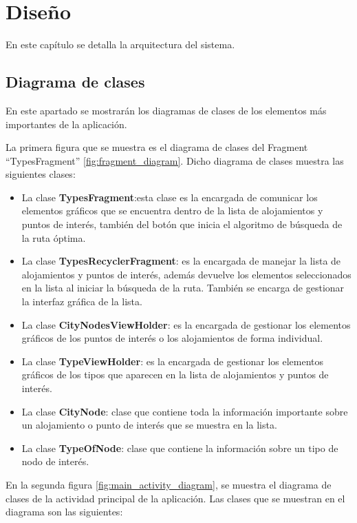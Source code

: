\chapter{Diseño}
En este capítulo se detalla la arquitectura del sistema.
\section[Diagrama de clases]{Diagrama de clases}
En este apartado se mostrarán los diagramas de clases de los elementos más importantes de la aplicación.\newline

La primera figura que se muestra es el diagrama de clases del Fragment \enquote{TypesFragment} \ref{fig:fragment_diagram}. Dicho diagrama de clases muestra las siguientes clases:
\begin{itemize}
	\item La clase \textbf{TypesFragment}:esta clase es la encargada de comunicar los elementos gráficos que se encuentra dentro de la lista de alojamientos y puntos de interés, también del botón que inicia el algoritmo de búsqueda de la ruta óptima.
	\item La clase \textbf{TypesRecyclerFragment}: es la encargada de manejar la lista de alojamientos y puntos de interés, además devuelve los elementos seleccionados en la lista al iniciar la búsqueda de la ruta. También se encarga de gestionar la interfaz gráfica de la lista.
	\item La clase \textbf{CityNodesViewHolder}: es la encargada de gestionar los elementos gráficos de los puntos de interés o los alojamientos de forma individual.
	\item La clase \textbf{TypeViewHolder}: es la encargada de gestionar los elementos gráficos de los tipos que aparecen en la lista de alojamientos y puntos de interés.
	\item La clase \textbf{CityNode}: clase que contiene toda la información importante sobre un alojamiento o punto de interés que se muestra en la lista.
	\item La clase \textbf{TypeOfNode}: clase que contiene la información sobre un tipo de nodo de interés.
\end{itemize}
\vspace{0.06in}
En la segunda figura  \ref{fig:main_activity_diagram}, se muestra el diagrama de clases de la actividad principal de la aplicación. Las clases que se muestran en el diagrama son las siguientes:
